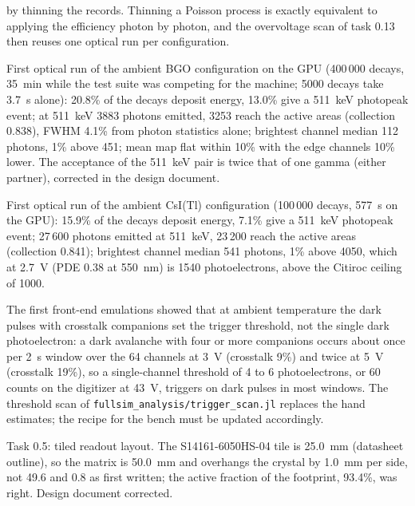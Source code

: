 \documentclass[11pt]{article}
\newcommand{\code}[1]{\texttt{#1}}
\newcommand{\us}{\textmu s\xspace}
\newcommand{\csitl}{CsI(Tl)\xspace}
\begin{document}
\begin{description}
  by thinning the records. Thinning a Poisson process is exactly equivalent
  to applying the efficiency photon by photon, and the overvoltage scan of
  task 0.13 then reuses one optical run per configuration.
\item[17 Oct 2026] First optical run of the ambient BGO configuration on the
  GPU (400\,000 decays, 35~min while the test suite was competing for the
  machine; 5000 decays take 3.7~s alone): 20.8\% of the decays deposit
  energy, 13.0\% give a 511~keV photopeak event; at 511~keV 3883 photons
  emitted, 3253 reach the active areas (collection 0.838), FWHM 4.1\% from
  photon statistics alone; brightest channel median 112 photons, 1\% above
  451; mean map flat within 10\% with the edge channels 10\% lower. The
  acceptance of the 511~keV pair is twice that of one gamma (either partner),
  corrected in the design document.
\item[17 Oct 2026] First optical run of the ambient \csitl configuration
  (100\,000 decays, 577~s on the GPU): 15.9\% of the decays deposit energy,
  7.1\% give a 511~keV photopeak event; 27\,600 photons emitted at 511~keV,
  23\,200 reach the active areas (collection 0.841); brightest channel
  median 541 photons, 1\% above 4050, which at 2.7~V (PDE 0.38 at 550~nm)
  is 1540 photoelectrons, above the Citiroc ceiling of 1000.
\item[17 Oct 2026] The first front-end emulations showed that at ambient
  temperature the dark pulses with crosstalk companions set the trigger
  threshold, not the single dark photoelectron: a dark avalanche with four
  or more companions occurs about once per 2~\us window over the 64
  channels at 3~V (crosstalk 9\%) and twice at 5~V (crosstalk 19\%), so a
  single-channel threshold of 4 to 6 photoelectrons, or 60 counts on the
  digitizer at 43~V, triggers on dark pulses in most windows. The threshold
  scan of \code{fullsim\_analysis/trigger\_scan.jl} replaces the
  hand estimates; the recipe for the bench must be updated accordingly.
\item[17 Oct 2026] Task 0.5: tiled readout layout. The S14161-6050HS-04 tile
  is 25.0~mm (datasheet outline), so the matrix is 50.0~mm and overhangs the
  crystal by 1.0~mm per side, not 49.6 and 0.8 as first written; the active
  fraction of the footprint, 93.4\%, was right. Design document corrected.
\end{description}
\end{document}
